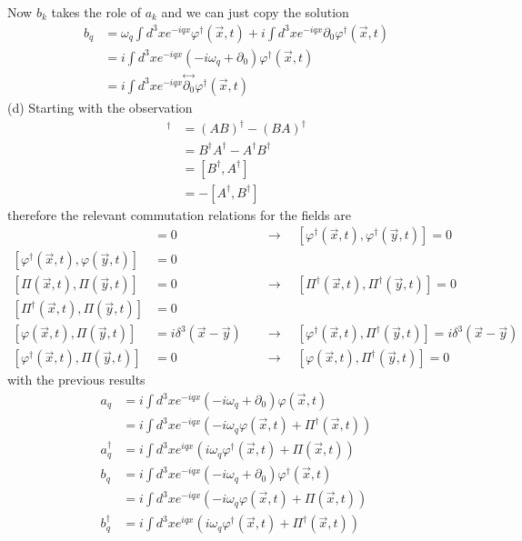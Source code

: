 \documentclass[10pt,a4paper]{article}
\theoremstyle{definition}
\begin{document}
Now $b_k$ takes the role of $a_k$ and we can just copy the solution
\begin{align}
b_q&=\omega_q\int d^3x e^{-iqx}\varphi^\dagger(\vec{x},t)+i\int d^3x e^{-iqx}\partial_0\varphi^\dagger(\vec{x},t)\\
&=i\int d^3x e^{-iqx}(-i\omega_q+\partial_0)\varphi^\dagger(\vec{x},t)\\
&=i\int d^3x e^{-iqx}\stackrel{\leftrightarrow}{\partial_0}\varphi^\dagger(\vec{x},t)
\end{align}
(d) Starting with the observation
\begin{align}
[A,B]^\dagger
&=(AB)^\dagger-(BA)^\dagger\\
&=B^\dagger A^\dagger- A^\dagger B^\dagger\\
&=[B^\dagger,A^\dagger]\\
&=-[A^\dagger,B^\dagger]
\end{align}
therefore the relevant commutation relations for the fields are
\begin{align}
[\varphi(\vec{x},t),\varphi(\vec{y},t)]&=0\quad&\rightarrow\quad[\varphi^\dagger(\vec{x},t),\varphi^\dagger(\vec{y},t)]=0\\
%
[\varphi^\dagger(\vec{x},t),\varphi(\vec{y},t)]&=0&\\
%
[\Pi(\vec{x},t),\Pi(\vec{y},t)]&=0\quad&\rightarrow\quad[\Pi^\dagger(\vec{x},t),\Pi^\dagger(\vec{y},t)]=0\\
%
[\Pi^\dagger(\vec{x},t),\Pi(\vec{y},t)]&=0&\\
%
[\varphi(\vec{x},t),\Pi(\vec{y},t)]&=i\delta^3(\vec{x}-\vec{y})\quad&\rightarrow\quad[\varphi^\dagger(\vec{x},t),\Pi^\dagger(\vec{y},t)]=i\delta^3(\vec{x}-\vec{y})\\
%
[\varphi^\dagger(\vec{x},t),\Pi(\vec{y},t)]&=0\quad&\rightarrow\quad[\varphi(\vec{x},t),\Pi^\dagger(\vec{y},t)]=0
\end{align}
with the previous results
\begin{align}
a_q&=i\int d^3x e^{-iqx}(-i\omega_q+\partial_0)\varphi(\vec{x},t)\\
&=i\int d^3x e^{-iqx}(-i\omega_q\varphi(\vec{x},t)+\Pi^\dagger(\vec{x},t))\\
a^\dagger_q&=i\int d^3x e^{iqx}(i\omega_q\varphi^\dagger(\vec{x},t)+\Pi(\vec{x},t))\\
b_q&=i\int d^3x e^{-iqx}(-i\omega_q+\partial_0)\varphi^\dagger(\vec{x},t)\\
&=i\int d^3x e^{-iqx}(-i\omega_q\varphi(\vec{x},t)+\Pi(\vec{x},t))\\
b^\dagger_q&=i\int d^3x e^{iqx}(i\omega_q\varphi^\dagger(\vec{x},t)+\Pi^\dagger(\vec{x},t))
\end{align}
\end{document}
